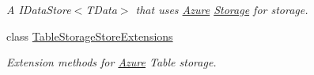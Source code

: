 \begin{DoxyCompactItemize}
\begin{DoxyCompactList}\small\item\em A I\+Data\+Store$<$\+T\+Data$>$ that uses \hyperlink{namespaceCqrs_1_1Azure}{Azure} \hyperlink{namespaceCqrs_1_1Azure_1_1Storage}{Storage} for storage. \end{DoxyCompactList}\item 
class \hyperlink{classCqrs_1_1Azure_1_1BlobStorage_1_1TableStorageStoreExtensions}{Table\+Storage\+Store\+Extensions}
\begin{DoxyCompactList}\small\item\em Extension methods for \hyperlink{namespaceCqrs_1_1Azure}{Azure} Table storage. \end{DoxyCompactList}\end{DoxyCompactItemize}
